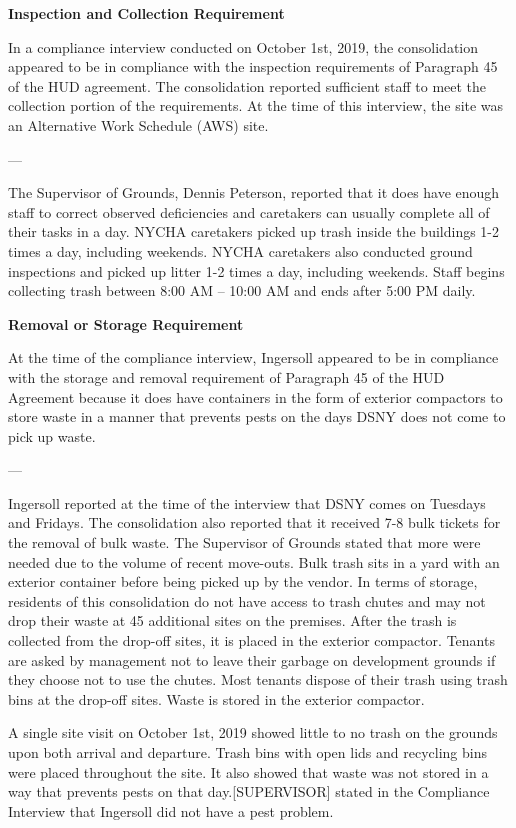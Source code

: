 

\textbf{Inspection and Collection Requirement}

In a compliance interview conducted on October 1st, 2019, the consolidation appeared to be in compliance with the inspection requirements of Paragraph 45 of the HUD agreement. The consolidation reported sufficient staff to meet the collection portion of the requirements. At the time of this interview, the site was an Alternative Work Schedule (AWS) site. 

---

The Supervisor of Grounds, Dennis Peterson, reported that it does have enough staff to correct observed deficiencies and caretakers can usually complete all of their tasks in a day. NYCHA caretakers picked up trash inside the buildings 1-2 times a day, including weekends. NYCHA caretakers also conducted ground inspections and picked up litter 1-2 times a day, including weekends. Staff begins collecting trash between 8:00 AM -- 10:00 AM and ends after 5:00 PM daily. 

\textbf{Removal or Storage Requirement}

At the time of the compliance interview, Ingersoll appeared to be in compliance with the storage and removal requirement of Paragraph 45 of the HUD Agreement because it does have containers in the form of exterior compactors to store waste in a manner that prevents pests on the days DSNY does not come to pick up waste.

---

Ingersoll reported at the time of the interview that DSNY comes on Tuesdays and Fridays. The consolidation also reported that it received 7-8 bulk tickets for the removal of bulk waste. The Supervisor of Grounds stated that more were needed due to the volume of recent move-outs. Bulk trash sits in a yard with an exterior container before being picked up by the vendor. In terms of storage, residents of this consolidation do not have access to trash chutes and may not drop their waste at 45 additional sites on the premises. After the trash is collected from the drop-off sites, it is placed in the exterior compactor. Tenants are asked by management not to leave their garbage on development grounds if they choose not to use the chutes. Most tenants dispose of their trash using trash bins at the drop-off sites. Waste is stored in the exterior compactor. 

A single site visit on October 1st, 2019 showed little to no trash on the grounds upon both arrival and departure.  Trash bins with open lids and recycling bins were placed throughout the site. It also showed that waste was not stored in a way that prevents pests on that day.[SUPERVISOR] stated in the Compliance Interview that Ingersoll did not have a pest problem.

